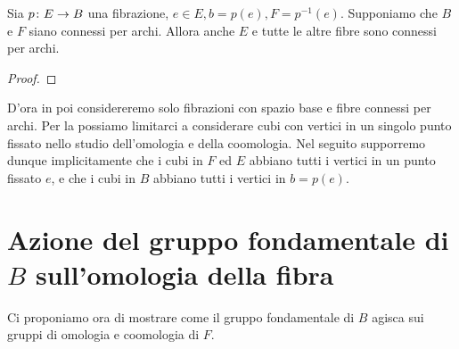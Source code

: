 \begin{proposition}
Sia $p\colon E\to B$ una fibrazione, $e\in E,b=p(e),F=p^{-1}(e)$. Supponiamo che $B$ e $F$ siano connessi per archi. Allora anche $E$ e tutte le altre fibre sono connessi per archi.
\end{proposition}
\begin{proof}

\end{proof}
D'ora in poi considereremo solo fibrazioni con spazio base e fibre connessi per archi. Per la  possiamo limitarci a considerare cubi con vertici in un singolo punto fissato nello studio dell'omologia e della coomologia. Nel seguito supporremo dunque implicitamente che i cubi in $F$ ed $E$ abbiano tutti i vertici in un punto fissato $e$, e che i cubi in $B$ abbiano tutti i vertici in $b=p(e)$.

\section{Azione del gruppo fondamentale di \texorpdfstring{$B$}{B} sull'omologia della fibra}

Ci proponiamo ora di mostrare come il gruppo fondamentale di $B$ agisca sui gruppi di omologia e coomologia di $F$.

